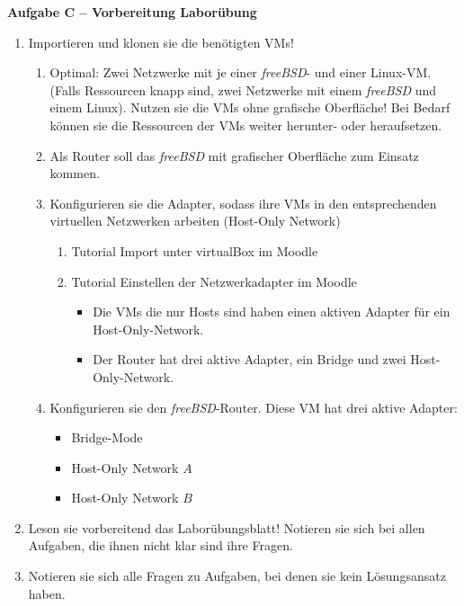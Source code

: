 \documentclass[paper=a4,fontsize=11pt]{scrartcl}%
\numberwithin{equation}{section}
\begin{document}
\begin{center}
\Large{\textbf{Aufgabe C -- Vorbereitung Laborübung}}
\end{center}
\vskip0.25in
\begin{enumerate}
	\item Importieren und klonen sie die benötigten VMs!
	\begin{enumerate}
		\item Optimal: Zwei Netzwerke mit je einer \emph{freeBSD}- und einer Linux-VM. (Falls Ressourcen knapp sind, zwei Netzwerke mit einem \emph{freeBSD} und einem Linux). Nutzen sie die VMs ohne grafische Oberfläche! Bei Bedarf können sie die Ressourcen der VMs weiter herunter- oder heraufsetzen.
		\item Als Router soll das \emph{freeBSD} mit grafischer Oberfläche zum Einsatz kommen.
		\item Konfigurieren sie die Adapter, sodass ihre VMs in den entsprechenden virtuellen Netzwerken arbeiten (Host-Only Network)
		\begin{enumerate}
			\item Tutorial Import unter virtualBox im Moodle
			\item Tutorial Einstellen der Netzwerkadapter im Moodle
			\begin{itemize}
				\item Die VMs die nur Hosts sind haben einen aktiven Adapter für ein Host-Only-Network.
				\item Der Router hat drei aktive Adapter, ein Bridge und zwei Host-Only-Network.
			\end{itemize}
		\end{enumerate}
		\item Konfigurieren sie den \emph{freeBSD}-Router. Diese VM hat drei aktive Adapter: 
		\begin{itemize}
			\item Bridge-Mode
			\item Host-Only Network $A$
			\item Host-Only Network $B$
		\end{itemize}
	\end{enumerate}
	\item Lesen sie vorbereitend das Laborübungsblatt! Notieren sie sich bei allen Aufgaben, die ihnen nicht klar sind ihre Fragen. 
	\item Notieren sie sich alle Fragen zu Aufgaben, bei denen sie kein Lösungsansatz haben.
\end{enumerate}

\printbibliography
\end{document}
